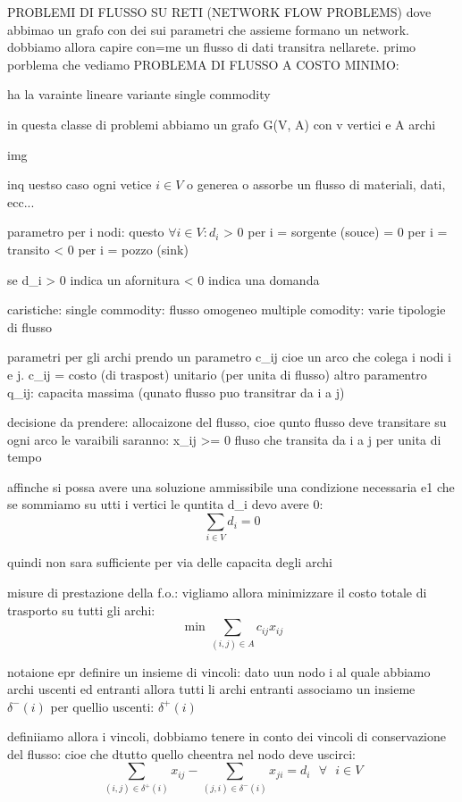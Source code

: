 PROBLEMI DI FLUSSO SU RETI (NETWORK FLOW PROBLEMS)
dove abbimao un grafo  con dei sui parametri che assieme formano un network. dobbiamo allora capire con=me un flusso di dati transitra nellarete.
primo porblema che vediamo
PROBLEMA DI FLUSSO A COSTO MINIMO:

ha la varainte lineare
variante single commodity


in questa classe di problemi abbiamo un grafo G(V, A)
con v vertici e A archi

img


inq uestso caso ogni vetice $i \in V$ o generea o assorbe un flusso di materiali, dati, ecc...

parametro per i nodi:
questo $\forall i \in V: d_i$
> 0 per i = sorgente (souce)
= 0 per i = transito
< 0 per i = pozzo (sink)


se d_i > 0 indica un afornitura
< 0 indica una domanda

caristiche:
single commodity: flusso omogeneo
multiple comodity: varie tipologie di flusso 


parametri per gli archi
prendo un parametro c_{ij} cioe un arco che colega i nodi i e j. c_{ij} = costo (di traspost) unitario (per unita di flusso)
altro paramentro q_{ij}: capacita massima (qunato flusso puo transitrar da i a j)


decisione da prendere: allocaizone del flusso, cioe qunto flusso deve transitare su ogni arco
le varaibili saranno: x_{ij} >= 0 fluso che transita da i a j per unita di tempo


affinche si possa avere una soluzione ammissibile una condizione necessaria e1 che se sommiamo su utti i vertici le quntita d_i devo avere 0:
$$\sum_{i\in V} d_i = 0$$

quindi non sara sufficiente per via delle capacita degli archi



misure di prestazione della f.o.:
vigliamo allora minimizzare il costo totale di trasporto su tutti gli archi:
$$\min \sum_{(i,j)\in A} c_{ij} x_{ij}$$

notaione epr definire un insieme di vincoli:
dato uun nodo i al quale abbiamo archi uscenti ed entranti allora tutti li archi entranti associamo un insieme $\delta^-(i)$ per quellio uscenti: $\delta^+(i)$


definiiamo allora i vincoli, dobbiamo tenere in conto dei vincoli di conservazione del flusso: cioe che dtutto quello cheentra nel nodo deve uscirci:
$$\sum_{(i,j)\in\delta^+(i)} x_{ij} - \sum_{(j,i)\in\delta^-(i)} x_{ji} = d_i\ \ \ \forall\ \ \ i\in V$$

